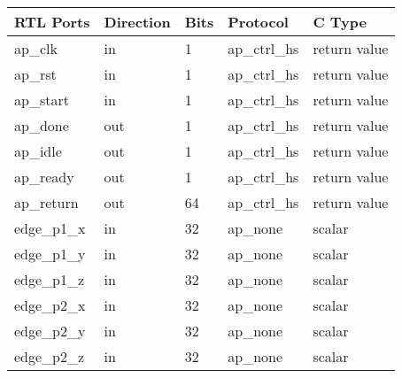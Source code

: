 \begin{table}[H]
\begin{centering}
\begin{tabular}{|l|l|l|l|l|}
\hline
\textbf{RTL Ports}  & \textbf{Direction}    & \textbf{Bits} & \textbf{Protocol} & \textbf{C Type} \\
\hline
ap\_clk  & in & 1 & ap\_ctrl\_hs & return value \\
\hline
ap\_rst  & in & 1 & ap\_ctrl\_hs & return value \\
\hline
ap\_start  & in & 1 & ap\_ctrl\_hs & return value \\
\hline
ap\_done  & out & 1 & ap\_ctrl\_hs & return value \\
\hline
ap\_idle  & out & 1 & ap\_ctrl\_hs & return value \\
\hline
ap\_ready  & out & 1 & ap\_ctrl\_hs & return value \\
\hline
ap\_return  & out & 64 & ap\_ctrl\_hs & return value \\
\hline
edge\_p1\_x   & in & 32 & ap\_none & scalar \\
\hline
edge\_p1\_y   & in & 32 & ap\_none & scalar \\
\hline
edge\_p1\_z   & in & 32 & ap\_none & scalar \\
\hline
edge\_p2\_x   & in & 32 & ap\_none & scalar \\
\hline
edge\_p2\_y   & in & 32 & ap\_none & scalar \\
\hline
edge\_p2\_z   & in & 32 & ap\_none & scalar \\
\hline
\end{tabular}
\end{centering}
\end{table}